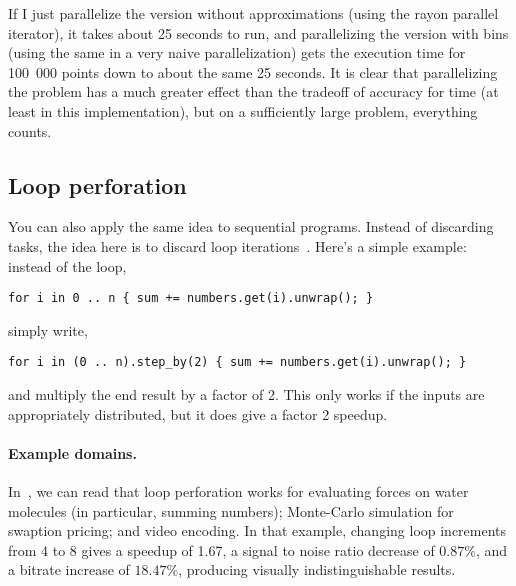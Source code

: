 If I just parallelize the version without approximations (using the rayon parallel iterator), it takes about 25 seconds to run, and parallelizing the version with bins (using the same in a very naive parallelization) gets the execution time for 100~000 points down to about the same 25 seconds. It is clear that parallelizing the problem has a much greater effect than the tradeoff of accuracy for time (at least in this implementation), but on a sufficiently large problem, everything counts.


\subsection*{Loop perforation} 
You can also apply the same idea to sequential programs. Instead
of discarding tasks, the idea here is to discard loop iterations~\cite{hoffmann09:_using_code_perfor_improv_perfor}.
Here's a simple example: instead of the loop,
\begin{center}
\verb|for i in 0 .. n { sum += numbers.get(i).unwrap(); }|
\end{center} \vspace*{-1em}
simply write,
\vspace*{-1em}\begin{center}
\verb|for i in (0 .. n).step_by(2) { sum += numbers.get(i).unwrap(); }|
\end{center}
and multiply the end result by a factor of 2. This only works 
if the inputs are appropriately distributed, but it does give a
factor 2 speedup.

\paragraph{Example domains.} In~\cite{Rinard:2010:PSA:1932682.1869525},
we can read that loop perforation works for evaluating forces on water
molecules (in particular, summing numbers); Monte-Carlo simulation for
swaption pricing; and video encoding. In that example, changing loop
increments from 4 to 8 gives a speedup of 1.67, a signal to noise ratio
decrease of $0.87\%$, and a bitrate increase of $18.47\%$, producing
visually indistinguishable results. 





